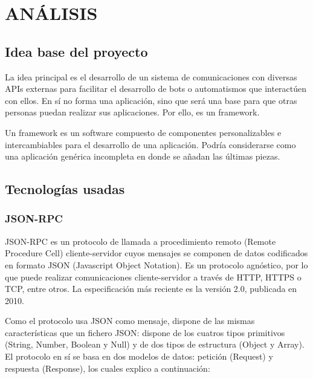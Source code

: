 \documentclass[spanish,12pt, a4paper, twoside]{paper}
\let\oldsection\section
\def\section{\cleardoublepage\oldsection}
\begin{document}
\section{ANÁLISIS}

\subsection{Idea base del proyecto}

La idea principal es el desarrollo de un sistema de comunicaciones con diversas APIs externas para facilitar el desarrollo de bots o automatismos que interactúen con ellos. En sí no forma una aplicación, sino que será una base para que otras personas puedan realizar sus aplicaciones. Por ello, es un framework.
\newline

Un framework es un software compuesto de componentes personalizables e intercambiables para el desarrollo de una aplicación. Podría considerarse como una aplicación genérica incompleta en donde se añadan las últimas piezas. \cite[pág. 1]{FrameworkJJG}

\subsection{Tecnologías usadas}

\subsubsection{JSON-RPC}

JSON-RPC es un protocolo de llamada a procedimiento remoto (Remote Procedure Cell) cliente-servidor cuyos mensajes se componen de datos codificados en formato JSON (Javascript Object Notation). Es un protocolo agnóstico, por lo que puede realizar comunicaciones cliente-servidor a través de HTTP, HTTPS o TCP, entre otros. La especificación más reciente es la versión 2.0, publicada en 2010.

Como el protocolo usa JSON como mensaje, dispone de las mismas características que un fichero JSON: dispone de los cuatros tipos primitivos (String, Number, Boolean y Null) y de dos tipos de estructura (Object y Array).
El protocolo en sí se basa en dos modelos de datos: petición (Request) y respuesta (Response), los cuales explico a continuación:
\end{document}
